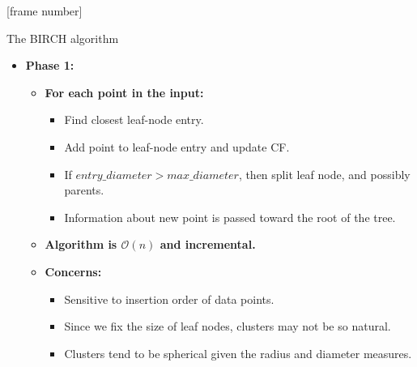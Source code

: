 \documentclass[aspectratio=169,t,xcolor=dvipsnames]{beamer}
\begin{document}
  { %
    [frame number]
    \begin{frame}{The BIRCH algorithm}
      \begin{itemize}
        \item \textbf{Phase 1:}
        \begin{itemize}
          \item \textbf{For each point in the input:}
          \begin{itemize}
            \item Find closest leaf-node entry.
            \item Add point to leaf-node entry and update CF.
            \item If $entry\_diameter > max\_diameter$, then split leaf node, and possibly parents.
            \item Information about new point is passed toward the root of the tree.
          \end{itemize}
          \item \textbf{Algorithm is $\mathcal{O}(n)$ and incremental.}
          \item \textbf{Concerns:}
          \begin{itemize}
            \item Sensitive to insertion order of data points.
            \item Since we fix the size of leaf nodes, clusters may not be so natural.
            \item Clusters tend to be spherical given the radius and diameter measures.
          \end{itemize}
        \end{itemize}
      \end{itemize}
    \end{frame}
  }
\end{document}
